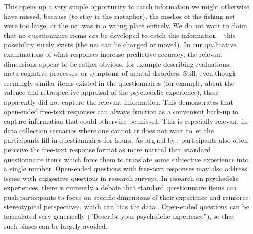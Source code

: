 \documentclass[man,floatsintext]{apa7}
\newcommand{\change}[1]{#1}
\begin{document}
This opens up a very simple opportunity to catch information we might otherwise have missed, because (to stay in the metaphor), the meshes of the fishing net were too large, or the net was in a wrong place entirely. We do not want to claim that no questionnaire items \emph{can} be developed to catch this information -- this possibility surely exists (the net can be changed or moved). In our qualitative examinations of what responses increase predictive accuracy, the relevant dimensions appear to be rather obvious, for example describing evaluations, meta-cognitive processes, or symptoms of mental disorders. Still, even though seemingly similar items existed in the questionnaires (for example, about the valence and retrospective appraisal of the psychedelic experience), these apparently did not capture the relevant information. This demonstrates that open-ended free-text responses can always function as a convenient back-up to capture information that could otherwise be missed. This is especially relevant in data collection scenarios where one cannot or does not want to let the participants fill in questionnaires for hours. As argued by \parencite{kjell2022natural,Kjell2019}, participants also often perceive the free-text response format as more natural than standard questionnaire items which force them to translate some subjective experience into a single number. \change{Open-ended questions with free-text responses may also address issues with suggestive questions in research surveys. In research on psychedelic experiences, there is currently a debate that standard questionnaire items can push participants to focus on specific dimensions of their experience and reinforce stereotypical perspectives, which can bias the data \parencite{vanderijst2026redefining}. Open-ended questions can be formulated very generically (``Describe your psychedelic experience''), so that such biases can be largely avoided.}
\end{document}
